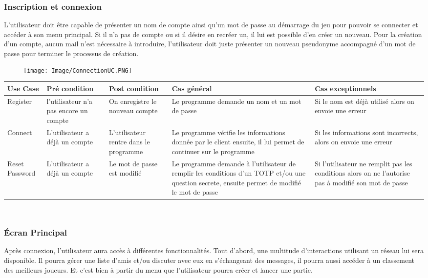 \documentclass[french, utf8]{article}
\begin{document}
\subsubsection{Inscription et connexion}
L'utilisateur doit être capable de présenter un nom de compte ainsi qu'un mot de passe au démarrage du jeu pour pouvoir se connecter et accéder à son menu principal. Si il n'a pas de compte ou si il désire en recréer un, il lui est possible d'en créer un nouveau. Pour la création d'un compte, aucun mail n'est nécessaire à introduire, l'utilisateur doit juste présenter un nouveau pseudonyme accompagné d'un mot de passe pour terminer le processus de création. \newline


\begin{figure}[ht]
     \centering
    \texttt{[image: Image/ConnectionUC.PNG]}

\end{figure}
\begin{center}
\begin{tabular}{|m{3cm}|m{3cm}|m{3cm}|m{3cm}|m{3cm}|}
\hline  Use Case & Pré condition      &  Post condition  & Cas général & Cas exceptionnels\\
\hline Register& l'utilisateur n'a pas  encore un compte & On enregistre le nouveau compte & Le programme demande un nom et un mot de passe & Si le nom est déjà utilisé alors on envoie une erreur  \\
\hline Connect  & L'utilisateur a déjà un compte & L'utilisateur rentre dans le programme & Le programme vérifie les informations donnée par le client ensuite, il lui permet de continuer sur le programme & Si les informations sont incorrects, alors on envoie une erreur \\
\hline Reset Password  & L'utilisateur a déjà un compte & Le mot de passe est modifié & Le programme demande à l'utilisateur de remplir les conditions d'un TOTP et/ou une question secrete, ensuite permet de modifié le mot de passe & Si l'utilisateur ne remplit pas les conditions alors on ne l'autorise pas à modifié son mot de passe \\
\hline
\end{tabular}\\
\end{center}
\subsubsection{Écran Principal}
\label{sec:MenuPrincipalUser}
Après connexion, l'utilisateur aura accès à différentes fonctionnalités. Tout d'abord, une multitude d'interactions utilisant un réseau lui sera disponible. Il pourra gérer une liste d'amis et/ou discuter avec eux en s'échangeant des messages, il pourra aussi accéder à un  classement des meilleurs joueurs. Et c'est bien à partir du menu que l'utilisateur pourra créer et lancer une partie. \newline
\end{document}
